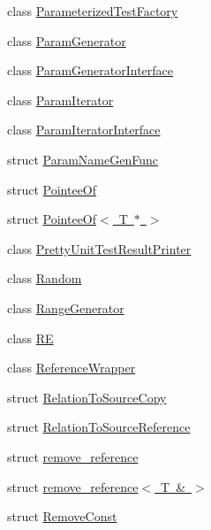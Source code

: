 \begin{DoxyCompactItemize}
\item 
class \mbox{\hyperlink{classtesting_1_1internal_1_1ParameterizedTestFactory}{Parameterized\+Test\+Factory}}
\item 
class \mbox{\hyperlink{classtesting_1_1internal_1_1ParamGenerator}{Param\+Generator}}
\item 
class \mbox{\hyperlink{classtesting_1_1internal_1_1ParamGeneratorInterface}{Param\+Generator\+Interface}}
\item 
class \mbox{\hyperlink{classtesting_1_1internal_1_1ParamIterator}{Param\+Iterator}}
\item 
class \mbox{\hyperlink{classtesting_1_1internal_1_1ParamIteratorInterface}{Param\+Iterator\+Interface}}
\item 
struct \mbox{\hyperlink{structtesting_1_1internal_1_1ParamNameGenFunc}{Param\+Name\+Gen\+Func}}
\item 
struct \mbox{\hyperlink{structtesting_1_1internal_1_1PointeeOf}{Pointee\+Of}}
\item 
struct \mbox{\hyperlink{structtesting_1_1internal_1_1PointeeOf_3_01T_01_5_01_4}{Pointee\+Of$<$ T $\ast$ $>$}}
\item 
class \mbox{\hyperlink{classtesting_1_1internal_1_1PrettyUnitTestResultPrinter}{Pretty\+Unit\+Test\+Result\+Printer}}
\item 
class \mbox{\hyperlink{classtesting_1_1internal_1_1Random}{Random}}
\item 
class \mbox{\hyperlink{classtesting_1_1internal_1_1RangeGenerator}{Range\+Generator}}
\item 
class \mbox{\hyperlink{classtesting_1_1internal_1_1RE}{RE}}
\item 
class \mbox{\hyperlink{classtesting_1_1internal_1_1ReferenceWrapper}{Reference\+Wrapper}}
\item 
struct \mbox{\hyperlink{structtesting_1_1internal_1_1RelationToSourceCopy}{Relation\+To\+Source\+Copy}}
\item 
struct \mbox{\hyperlink{structtesting_1_1internal_1_1RelationToSourceReference}{Relation\+To\+Source\+Reference}}
\item 
struct \mbox{\hyperlink{structtesting_1_1internal_1_1remove__reference}{remove\+\_\+reference}}
\item 
struct \mbox{\hyperlink{structtesting_1_1internal_1_1remove__reference_3_01T_01_6_01_4}{remove\+\_\+reference$<$ T \& $>$}}
\item 
struct \mbox{\hyperlink{structtesting_1_1internal_1_1RemoveConst}{Remove\+Const}}
\item 

\end{DoxyCompactItemize}
